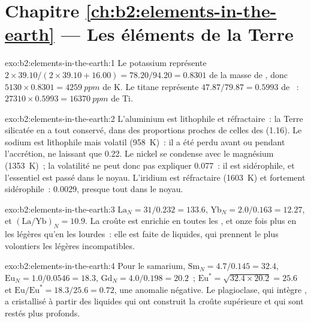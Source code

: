 \section*{Chapitre \ref{ch:b2:elements-in-the-earth} --- Les éléments de la Terre}

\begin{solution}{exo:b2:elements-in-the-earth:1}
Le potassium représente $2\times39.10/(2\times39.10+16.00) = 78.20/94.20 = 0.8301$ de la
masse de , donc $\num{5130}\times0.8301 = \qty{4259}{ppm}$ de K. Le titane représente
$47.87/79.87 = 0.5993$ de ~: $\num{27310}\times0.5993 = \qty{16370}{ppm}$ de Ti.
\end{solution}

\begin{solution}{exo:b2:elements-in-the-earth:2}
L'aluminium est lithophile et réfractaire~: la Terre silicatée en a tout conservé, dans des
proportions proches de celles des  (1.16). Le sodium est lithophile mais volatil
(\qty{958}{K})~: il a été perdu avant ou pendant l'accrétion, ne laissant que 0.22. Le
nickel se condense avec le magnésium (\qty{1353}{K})~; la volatilité ne peut donc pas
expliquer 0.077~: il est sidérophile, et l'essentiel est passé dans le noyau. L'iridium est
réfractaire (\qty{1603}{K}) et fortement sidérophile~: 0.0029, presque tout dans le noyau.
\end{solution}

\begin{solution}{exo:b2:elements-in-the-earth:3}
$\mathrm{La}_N = 31/0.232 = 133.6$, $\mathrm{Yb}_N = 2.0/0.163 = 12.27$, et
$(\mathrm{La}/\mathrm{Yb})_N = 10.9$. La croûte est enrichie en toutes les , et onze fois plus en les légères qu'en les lourdes~: elle est faite de
liquides, qui prennent le plus volontiers les  légères incompatibles.
\end{solution}

\begin{solution}{exo:b2:elements-in-the-earth:4}
Pour le samarium, $\mathrm{Sm}_N = 4.7/0.145 = 32.4$, $\mathrm{Eu}_N = 1.0/0.0546 = 18.3$,
$\mathrm{Gd}_N = 4.0/0.198 = 20.2$~; $\mathrm{Eu}^* = \sqrt{32.4\times20.2} = 25.6$
et $\mathrm{Eu}/\mathrm{Eu}^* = 18.3/25.6 = 0.72$, une anomalie négative.
Le plagioclase, qui intègre , a cristallisé à partir des liquides
qui ont construit la croûte supérieure et qui sont restés plus profonds.
\end{solution}

